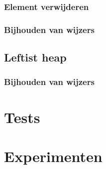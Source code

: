 \documentclass[a4paper,12pt]{report}
\begin{document}
\subsection{Element verwijderen}
\subsection{Bijhouden van wijzers}
\section{Leftist heap}
\subsection{Bijhouden van wijzers}
\chapter{Tests} %

\chapter{Experimenten} %
\end{document}

